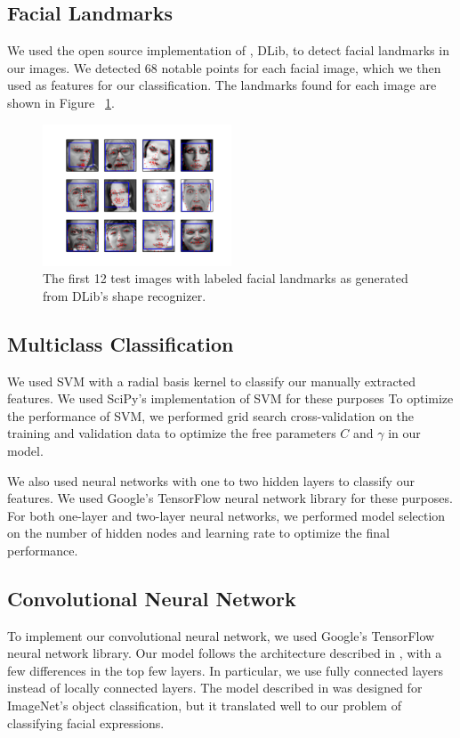 \documentclass[10pt, twocolumn, twoside]{article}
\begin{document}
\subsection{Facial Landmarks}
We used the open source implementation of \cite{Kazemi}, DLib, to detect facial
landmarks in our images. We detected 68 notable points for each facial image, which
we then used as features for our classification. The landmarks found for each image
are shown in Figure ~\ref{fig:landmarks}.

\begin{figure}[!htbp]
\centering
\includegraphics[width=0.5\textwidth]{landmarks}
\caption{\label{fig:landmarks} The first 12 test images with labeled facial landmarks
as generated from DLib's shape recognizer.}
\end{figure}

\subsection{Multiclass Classification}

We used SVM with a radial basis kernel to classify our manually
extracted features. We used SciPy's implementation of SVM for these purposes
To optimize the performance of SVM, we performed grid
search cross-validation on the training and validation data to optimize the
free parameters $C$ and $\gamma$ in our model.

We also used neural networks with one to two hidden layers to classify
our features. We used Google's TensorFlow neural network library for these
purposes. For both one-layer and two-layer neural networks, we performed 
model selection on the number of hidden nodes and learning rate to optimize
the final performance.

\subsection{Convolutional Neural Network}

To implement our convolutional neural network, we used Google's TensorFlow neural network library.
Our model follows the architecture described in \cite{Krizhevsky}, with a few differences in the top few layers.
In particular, we use fully connected layers instead of locally connected layers. The model described in
\cite{Krizhevsky} was designed for ImageNet's object classification, but it translated well to our problem of classifying facial expressions.
\end{document}

